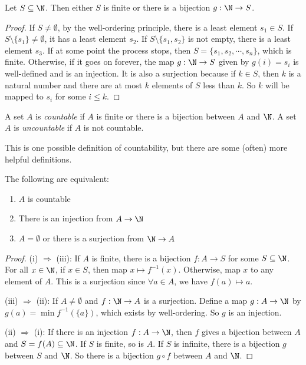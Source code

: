 \documentclass[a4paper]{article}
\begin{document}
\begin{lemma}
  Let $S\subseteq \N$. Then either $S$ is finite or there is a bijection $g:\N \to S$.
\end{lemma}

\begin{proof}
  If $S\not= \emptyset$, by the well-ordering principle, there is a least element $s_1\in S$. If $S\setminus \{s_1\} \not= \emptyset$, it has a least element $s_2$. If $S\setminus \{s_1, s_2\}$ is not empty, there is a least element $s_3$. If at some point the process stops, then $S = \{s_1, s_2,\cdots, s_n\}$, which is finite. Otherwise, if it goes on forever, the map $g: \N \to S$ given by $g(i) = s_i$ is well-defined and is an injection. It is also a surjection because if $k\in S$, then $k$ is a natural number and there are at most $k$ elements of $S$ less than $k$. So $k$ will be mapped to $s_i$ for some $i\leq k$.
\end{proof}

\begin{defi}
  A set $A$ is \emph{countable} if $A$ is finite or there is a bijection between $A$ and $\N$. A set $A$ is \emph{uncountable} if $A$ is not countable.
\end{defi}

This is one possible definition of countability, but there are some (often) more helpful definitions.
\begin{thm}
  The following are equivalent:
  \begin{enumerate}
    \item $A$ is countable
    \item There is an injection from $A\to \N$
    \item $A = \emptyset$ or there is a surjection from $\N \to A$
  \end{enumerate}
\end{thm}

\begin{proof}
  (i) $\Rightarrow$ (iii): If $A$ is finite, there is a bijection $f: A \to S$ for some $S\subseteq \N$. For all $x\in \N$, if $x\in S$, then map $x\mapsto f^{-1}(x)$. Otherwise, map $x$ to any element of $A$. This is a surjection since $\forall a\in A$, we have $f(a)\mapsto a$.

  (iii) $\Rightarrow$ (ii): If $A\not= \emptyset$ and $f: \N\to A$ is a surjection. Define a map $g: A\to \N$ by $g(a) = \min f^{-1}(\{a\})$, which exists by well-ordering. So $g$ is an injection.

  (ii) $\Rightarrow$ (i): If there is an injection $f: A\to \N$, then $f$ gives a bijection between $A$ and $S = f(A)\subseteq \N$. If $S$ is finite, so is $A$. If $S$ is infinite, there is a bijection $g$ between $S$ and $\N$. So there is a bijection $g\circ f$ between $A$ and $\N$.
\end{proof}
\end{document}
